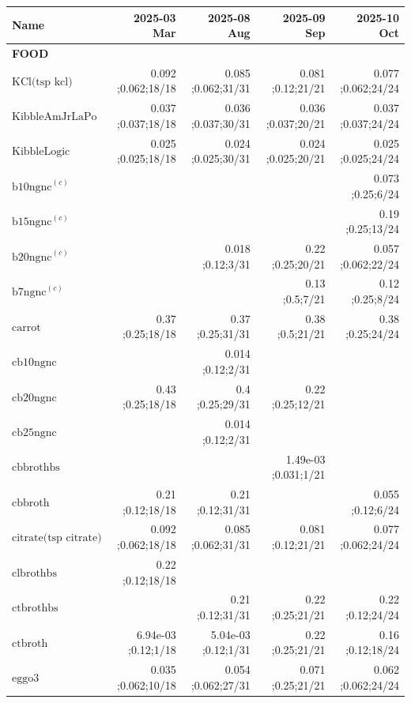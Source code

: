 \newcommand{\mjmdateminn}{2025-03-01}
\newcommand{\mjmdatemaxn}{2025-10-24}
\newcommand{\mjmsuperscriptsn}{{\bf a) } SMVT substrate. Biotin, Pantothenate, Lipoic Acid, and Iodine known to compete..{\bf c) } hamburger with varying fat percentages- 7,10,15,20, etc. ..}
\begin{table}[H]
\centering
\begin{tabular}{|l|r|r|r|r|}
\hline
Name&2025-03 Mar&2025-08 Aug&2025-09 Sep&2025-10 Oct\\
\hline
{\bf FOOD}&&&&\\
$\textrm{KCl(tsp~kcl)}$&0.092 ;0.062;18/18&0.085 ;0.062;31/31&0.081 ;0.12;21/21&0.077 ;0.062;24/24\\
$\textrm{KibbleAmJrLaPo}$&0.037 ;0.037;18/18&0.036 ;0.037;30/31&0.036 ;0.037;20/21&0.037 ;0.037;24/24\\
$\textrm{KibbleLogic}$&0.025 ;0.025;18/18&0.024 ;0.025;30/31&0.024 ;0.025;20/21&0.025 ;0.025;24/24\\
$\textrm{b10ngnc}^{\left(c\right)}$&&&&0.073 ;0.25;6/24\\
$\textrm{b15ngnc}^{\left(c\right)}$&&&&0.19 ;0.25;13/24\\
$\textrm{b20ngnc}^{\left(c\right)}$&&0.018 ;0.12;3/31&0.22 ;0.25;20/21&0.057 ;0.062;22/24\\
$\textrm{b7ngnc}^{\left(c\right)}$&&&0.13 ;0.5;7/21&0.12 ;0.25;8/24\\
$\textrm{carrot}$&0.37 ;0.25;18/18&0.37 ;0.25;31/31&0.38 ;0.5;21/21&0.38 ;0.25;24/24\\
$\textrm{cb10ngnc}$&&0.014 ;0.12;2/31&&\\
$\textrm{cb20ngnc}$&0.43 ;0.25;18/18&0.4 ;0.25;29/31&0.22 ;0.25;12/21&\\
$\textrm{cb25ngnc}$&&0.014 ;0.12;2/31&&\\
$\textrm{cbbrothbs}$&&&1.49e-03 ;0.031;1/21&\\
$\textrm{cbbroth}$&0.21 ;0.12;18/18&0.21 ;0.12;31/31&&0.055 ;0.12;6/24\\
$\textrm{citrate(tsp~citrate)}$&0.092 ;0.062;18/18&0.085 ;0.062;31/31&0.081 ;0.12;21/21&0.077 ;0.062;24/24\\
$\textrm{clbrothbs}$&0.22 ;0.12;18/18&&&\\
$\textrm{ctbrothbs}$&&0.21 ;0.12;31/31&0.22 ;0.25;21/21&0.22 ;0.12;24/24\\
$\textrm{ctbroth}$&6.94e-03 ;0.12;1/18&5.04e-03 ;0.12;1/31&0.22 ;0.25;21/21&0.16 ;0.12;18/24\\
$\textrm{eggo3}$&0.035 ;0.062;10/18&0.054 ;0.062;27/31&0.071 ;0.25;21/21&0.062 ;0.062;24/24\\

\end{tabular}
\end{table}
